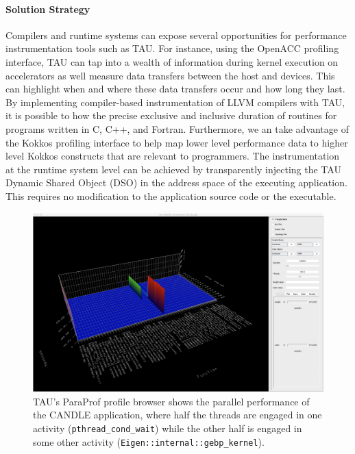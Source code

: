 \paragraph{Solution Strategy} Compilers and runtime systems can expose several opportunities for performance instrumentation tools such as TAU.  For instance, using the OpenACC profiling interface, TAU can tap into a wealth of information during kernel execution on accelerators as well measure data transfers between the host and devices. This can highlight when and where these data transfers occur and how long they last.  By implementing compiler-based instrumentation of LLVM compilers with TAU, it is possible to how the precise exclusive and inclusive duration of routines for programs written in C, C++, and Fortran.  Furthermore, we an take advantage of the Kokkos profiling interface to help map lower level performance data to higher level Kokkos constructs that are relevant to programmers. The instrumentation at the runtime system level can be achieved by transparently injecting the TAU Dynamic Shared Object (DSO) in the address space of the executing application. This requires no modification to the application source code or the executable. 

\begin{figure}[htb]
\centering
\includegraphics[width=6in]{projects/2.3.2-Tools/2.3.2.09-PROTEAS/tau-3d-candle}
\caption{
  TAU's ParaProf profile browser shows the parallel performance of the CANDLE application, where half the threads are engaged in one activity (\texttt{pthread\_cond\_wait}) while the other half is engaged in some other activity (\texttt{Eigen::internal::gebp\_kernel}).
}
\label{figure:tau}
\end{figure}

